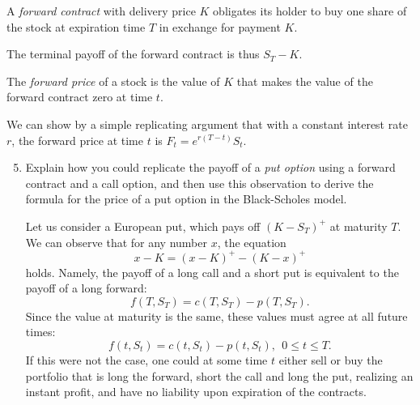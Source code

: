 \documentclass[handout,8pt]{beamer}
\begin{document}
\begin{frame}[allowframebreaks]{ }
\begin{enumerate}
    \newpage
    \vspace*{1.75cm}
    
    A \textit{forward contract} with delivery price $K$ obligates its holder to buy one share of the stock at expiration time $T$ in exchange for payment $K$. \newline
    
    The terminal payoff of the forward contract is thus $S_T - K$. \newline
    
    The \textit{forward price} of a stock is the value of $K$ that makes the value of the forward contract zero at time $t$. \newline
    
    We can show by a simple replicating argument that with a constant interest rate $r$, the forward price at time $t$ is $F_t=e^{r(T-t)}S_t$.
    
    \newpage
    
    \begin{enumerate}
        \setcounter{enumii}{4}
    
    \vspace*{0.50cm}
    
        \item Explain how you could replicate the payoff of a \textit{put option} using a forward contract and a call option, and then use this observation to derive the formula for the price of a put option in the Black-Scholes model. \newline
        
        Let us consider a European put, which pays off $(K-S_T)^+$ at maturity $T$. We can observe that for any number $x$, the equation
        \begin{equation*}
            x-K = (x-K)^+ - (K-x)^+
        \end{equation*}
        holds. Namely, the payoff of a long call and a short put is equivalent to the payoff of a long forward:
        \begin{equation*}
            f(T,S_T) = c(T,S_T)-p(T,S_T).
        \end{equation*}
        Since the value at maturity is the same, these values must agree at all future times:
        \begin{equation}
            f(t,S_t) = c(t,S_t) -p(t,S_t), ~~ 0\leq t \leq T.
        \end{equation}
        If this were not the case, one could at some time $t$ either sell or buy the portfolio that is long the forward, short the call and long the put, realizing an instant profit, and have no liability upon expiration of the contracts. \newline
        

\end{enumerate}
\end{enumerate}
\end{frame}
\end{document}
